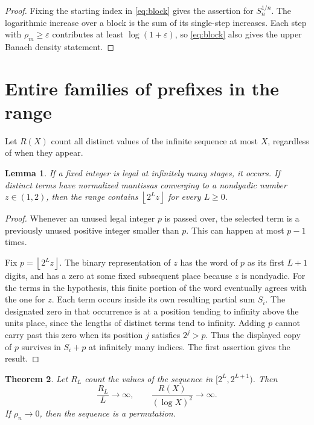 \documentclass[11pt]{article}
\newtheorem{theorem}{Theorem}[section]
\newtheorem{lemma}[theorem]{Lemma}
\newcommand{\fl}[1]{\left\lfloor#1\right\rfloor}
\begin{document}
\begin{proof}
Fixing the starting index in \eqref{eq:block} gives the assertion for $S_n^{1/n}$. The logarithmic increase over a block is the sum of its single-step increases. Each step with $\rho_m\ge\varepsilon$ contributes at least $\log(1+\varepsilon)$, so \eqref{eq:block} also gives the upper Banach density statement.
\end{proof}

\section{Entire families of prefixes in the range}
Let $R(X)$ count all distinct values of the infinite sequence at most $X$, regardless of when they appear.
\begin{lemma}\label{lem:compulsory}
If a fixed integer is legal at infinitely many stages, it occurs. If distinct terms have normalized mantissas converging to a nondyadic number $z\in(1,2)$, then the range contains $\fl{2^L z}$ for every $L\ge0$.
\end{lemma}
\begin{proof}
Whenever an unused legal integer $p$ is passed over, the selected term is a previously unused positive integer smaller than $p$. This can happen at most $p-1$ times.

Fix $p=\fl{2^L z}$. The binary representation of $z$ has the word of $p$ as its first $L+1$ digits, and has a zero at some fixed subsequent place because $z$ is nondyadic. For the terms in the hypothesis, this finite portion of the word eventually agrees with the one for $z$. Each term occurs inside its own resulting partial sum $S_i$. The designated zero in that occurrence is at a position tending to infinity above the units place, since the lengths of distinct terms tend to infinity. Adding $p$ cannot carry past this zero when its position $j$ satisfies $2^j>p$. Thus the displayed copy of $p$ survives in $S_i+p$ at infinitely many indices. The first assertion gives the result.
\end{proof}
\begin{theorem}\label{th:rays}
Let $R_L$ count the values of the sequence in $[2^L,2^{L+1})$. Then
\[
 \frac{R_L}{L}\longrightarrow\infty,\qquad
 \frac{R(X)}{(\log X)^2}\longrightarrow\infty .
\]
If $\rho_n\to0$, then the sequence is a permutation.
\end{theorem}
\end{document}
